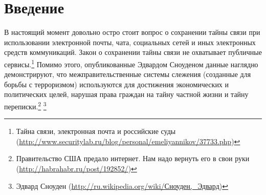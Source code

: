 \newpage
\addtocounter{chapter}{1}
\tableofcontents
\newpage
\section{Введение}
В настоящий момент довольно остро стоит вопрос о сохранении тайны связи при использовании электронной почты, чата, социальных сетей и иных электронных средств коммуникаций. Закон о сохранении тайны связи не охватывает публичные сервисы.\footnote{ Тайна связи, электронная почта и российские суды (\url{http://www.securitylab.ru/blog/personal/emeliyannikov/37733.php})}
Помимо этого, опубликованные Эдвардом Сноуденом данные наглядно демонстрируют, что межправительственные системы слежения (созданные для борьбы с терроризмом) используются для достижения экономических и политических целей,  нарушая права граждан на тайну частной жизни и тайну переписки.\footnote{Правительство США предало интернет. Нам надо вернуть его в свои руки (\url{http://habrahabr.ru/post/192852/})} \footnote{Эдвард Сноуден (\url{http://ru.wikipedia.org/wiki/Сноуден,\_Эдвард})}\\

